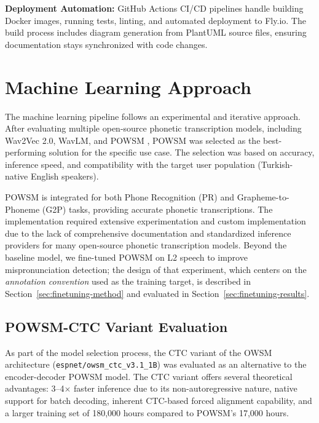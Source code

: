 \documentclass[a4paper,12pt]{report}
\begin{document}
\textbf{Deployment Automation:} GitHub Actions CI/CD pipelines handle building Docker images, running tests, linting, and automated deployment to Fly.io. The build process includes diagram generation from PlantUML source files, ensuring documentation stays synchronized with code changes.

\section{Machine Learning Approach}

The machine learning pipeline follows an experimental and iterative approach. After evaluating multiple open-source phonetic transcription models, including Wav2Vec 2.0, WavLM, and POWSM \cite{powsm}, POWSM was selected as the best-performing solution for the specific use case. The selection was based on accuracy, inference speed, and compatibility with the target user population (Turkish-native English speakers).

POWSM \cite{powsm} is integrated for both Phone Recognition (PR) and Grapheme-to-Phoneme (G2P) tasks, providing accurate phonetic transcriptions. The implementation required extensive experimentation and custom implementation due to the lack of comprehensive documentation and standardized inference providers for many open-source phonetic transcription models. Beyond the baseline model, we fine-tuned POWSM on L2 speech to improve mispronunciation detection; the design of that experiment, which centers on the \emph{annotation convention} used as the training target, is described in Section~\ref{sec:finetuning-method} and evaluated in Section~\ref{sec:finetuning-results}.

\subsection{POWSM-CTC Variant Evaluation}

As part of the model selection process, the CTC variant of the OWSM architecture (\texttt{espnet/owsm\_ctc\_v3.1\_1B}) \cite{owsmctc} was evaluated as an alternative to the encoder-decoder POWSM model. The CTC variant offers several theoretical advantages: 3--4$\times$ faster inference due to its non-autoregressive nature, native support for batch decoding, inherent CTC-based forced alignment capability, and a larger training set of 180,000 hours compared to POWSM's 17,000 hours.
\end{document}
